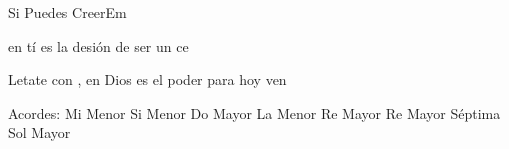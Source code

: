\documentclass[12pt, spanish]{book}
\begin{document}
\begin{song}{Si Puedes Creer}{Em}
\begin{SBOpGroup}
            en tí es la desión de ser un ce

            Letate con , en Dios es el poder para hoy ven
        \end{SBOpGroup}

        \ifChordBk
        \begin{SBOpGroup}
            Acordes:
            \upchord{\Em}\qquad Mi Menor \hfill
            \upchord{\Bm}\qquad Si Menor \hfill\null\break
            \upchord{\C}\qquad Do Mayor \hfill
            \upchord{\Am}\qquad La Menor \hfill\null\break
            \upchord{\D}\qquad Re Mayor \hfill
            \upchord{\Dseven}\qquad Re Mayor S\'eptima \hfill\null\break
            \upchord{\G}\qquad Sol Mayor \hfill
        \end{SBOpGroup}
        \fi
    \end{song}
\end{document}
